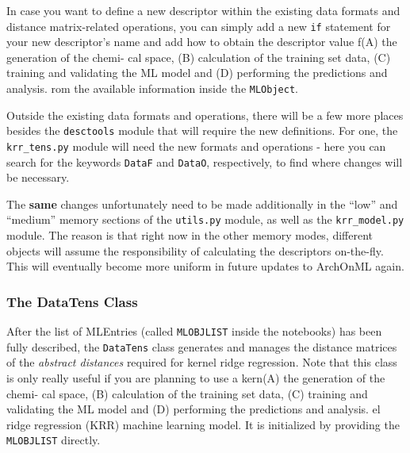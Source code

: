 \documentclass[12pt]{achemso}
\begin{document}
\noindent In case you want to define a new descriptor within the existing data formats and distance matrix-related operations, you can simply add a new \texttt{if} statement for your new descriptor's name and add how to obtain the descriptor value f(A) the generation of the chemi-
cal space, (B) calculation of the training set data, (C) training
and validating the ML model and (D) performing the predictions
and analysis. rom the available information inside the \texttt{MLObject}.

\noindent Outside the existing data formats and operations, there will be a few more places besides the \texttt{desctools} module that will require the new definitions. For one, the \texttt{krr\_tens.py} module will need the new formats and operations - here you can search for the keywords \texttt{DataF} and \texttt{DataO}, respectively, to find where changes will be necessary.

\noindent The \textbf{same} changes unfortunately need to be made additionally in the ``low'' and ``medium'' memory sections of the \texttt{utils.py} module, as well as the \texttt{krr\_model.py} module. The reason is that right now in the other memory modes, different objects will assume the responsibility of calculating the descriptors on-the-fly. This will eventually become more uniform in future updates to ArchOnML again.

\subsubsection{The DataTens Class}

\noindent After the list of MLEntries (called \texttt{MLOBJLIST} inside the notebooks) has been fully described, the \texttt{DataTens} class generates and manages the distance matrices of the \textit{abstract distances} required for kernel ridge regression. Note that this class is only really useful if you are planning to use a kern(A) the generation of the chemi-
cal space, (B) calculation of the training set data, (C) training
and validating the ML model and (D) performing the predictions
and analysis. el ridge regression (KRR) machine learning model. It is initialized by providing the \texttt{MLOBJLIST} directly.\\[-0.7em]

\vspace{1.0em}
\end{document}
